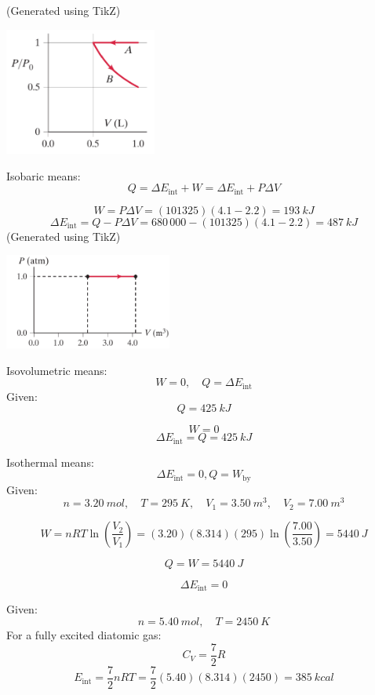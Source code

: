 \documentclass[11pt]{homework}
\begin{document}
\question
(Generated using TikZ)
\begin{center}
    \includegraphics[width=50mm,scale=0.5]{q33.pdf}
\end{center}

\setcounter{questionCounter}{34}
\question
Isobaric means:
\[
Q = \Delta E_{\text{int}} + W = \Delta E_{\text{int}} + P\Delta V
\]
\begin{alphaparts}
\questionpart
\[
W = P\Delta V = (101325)(4.1 - 2.2) = \boxed{\qty{193}{kJ}}
\]
\questionpart
\[
\Delta E_{\text{int}} = Q - P \Delta V = 680\,000 - (101325)(4.1 - 2.2) = \boxed{\qty{487}{kJ}}
\]
\questionpart
(Generated using TikZ)
\begin{center}
    \includegraphics[width=55mm,scale=0.5]{q35.pdf}
\end{center}
\end{alphaparts}


\question
Isovolumetric means:
\[
W = 0, \quad Q = \Delta E_{\text{int}}
\]
Given:
\[
Q = \qty{425}{kJ}
\]

\begin{alphaparts}
\questionpart
\[
\boxed{W=0}
\]
\questionpart
\[
\Delta E_{\text{int}} = Q = \boxed{\qty{425}{kJ}}
\]


\end{alphaparts}


\setcounter{questionCounter}{39}
\question
Isothermal means:
\[
\Delta E_{\text{int}} = 0, Q = W_{\text{by}}
\]
Given:
\[
n = \qty{3.20}{mol}, \quad T = \qty{295}{K}, \quad V_1 = \qty{3.50}{m^3}, \quad V_2 = \qty{7.00}{m^3}
\]

\begin{alphaparts}
\questionpart
\[
W = nRT \ln (\frac{V_2}{V_1}) = (3.20)(8.314)(295)\ln(\frac{7.00}{3.50}) = \boxed{\qty{5440}{J}}
\]

\questionpart
\[
Q = W = \boxed{\qty{5440}{J}}
\]

\questionpart
\[
    \boxed{\Delta E_{\text{int}} = 0}
\]


\end{alphaparts}


\setcounter{questionCounter}{48}
\question
Given:
\[
n=\qty{5.40}{mol}, \quad T = \qty{2450}{K}
\]
For a fully excited diatomic gas:
\[
C_V = \frac{7}{2}R
\]
\[
E_{\text{int}} = \frac{7}{2}nRT = \frac{7}{2}(5.40)(8.314)(2450) = \boxed{\qty{385}{kcal}}
\]
\end{document}
